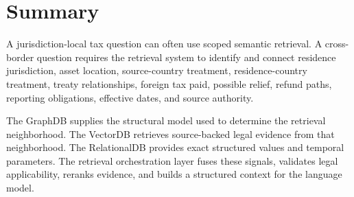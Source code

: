 \documentclass[11pt,a4paper]{article}
\begin{document}
\section{Summary}
A jurisdiction-local tax question can often use scoped semantic retrieval. A cross-border question requires the retrieval system to identify and connect residence jurisdiction, asset location, source-country treatment, residence-country treatment, treaty relationships, foreign tax paid, possible relief, refund paths, reporting obligations, effective dates, and source authority.

The GraphDB supplies the structural model used to determine the retrieval neighborhood. The VectorDB retrieves source-backed legal evidence from that neighborhood. The RelationalDB provides exact structured values and temporal parameters. The retrieval orchestration layer fuses these signals, validates legal applicability, reranks evidence, and builds a structured context for the language model.
\end{document}
